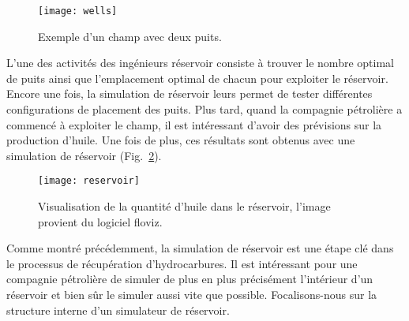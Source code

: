 \begin{figure}[!ht]
  \centering
  \texttt{[image: wells]}
  \caption{Exemple d'un champ avec deux puits.}
\label{fig:wells}
\end{figure}


L'une des activités des ingénieurs réservoir consiste à trouver le nombre optimal de puits ainsi que l'emplacement optimal de chacun pour exploiter le réservoir.
%
Encore une fois, la simulation de réservoir leurs permet de tester différentes configurations de placement des puits.
%
Plus tard, quand la compagnie pétrolière a commencé à exploiter le champ, il est intéressant d'avoir des prévisions sur la production d'huile.
%
Une fois de plus, ces résultats sont obtenus avec une simulation de réservoir (Fig.~\ref{fig:floviz}).

\begin{figure}[!ht]
  \centering
  \texttt{[image: reservoir]}
  \caption{Visualisation de la quantité d'huile dans le réservoir, l'image provient du logiciel floviz.}
\label{fig:floviz}
\end{figure}

Comme montré précédemment, la simulation de réservoir est une étape clé dans le processus de récupération d'hydrocarbures.
%
Il est intéressant pour une compagnie pétrolière de simuler de plus en plus précisément l'intérieur d'un réservoir et bien sûr le simuler aussi vite que possible.
%
Focalisons-nous sur la structure interne d'un simulateur de réservoir.
